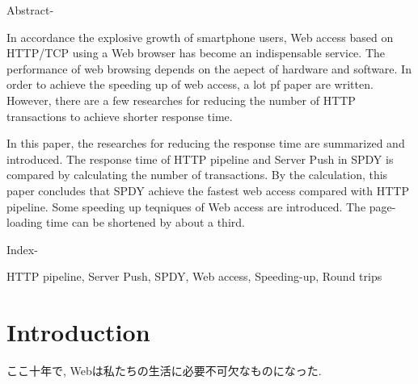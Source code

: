 \documentclass[11pt, a4paper, twocolumn]{jsarticle}
\begin{document}

\begin{spacing}{0.7}
\begin{bfseries}
\begin{itshape}
Abstract-
\end{itshape}
In accordance the explosive growth of smartphone users, Web access based on
HTTP/TCP using a Web browser has become an indispensable service.
The performance of web browsing depends on the aepect of hardware and software.
In order to achieve the speeding up of web access, a lot
pf paper are written.
However, there are a few researches for reducing the number of HTTP transactions
to achieve shorter response time.

In this paper, the researches for reducing the response time are summarized and
introduced.
The response time of HTTP pipeline and Server Push in SPDY is compared by
calculating the number of transactions.
By the calculation, this paper concludes that SPDY achieve the fastest web
access compared with HTTP pipeline.
Some speeding up teqniques of Web access are introduced.
The page-loading time can be shortened by about a third.\\

\begin{itshape}
Index-
\end{itshape}
HTTP pipeline, Server Push, SPDY, Web access, Speeding-up, Round trips
\end{bfseries}
\end{spacing}
\section{Introduction}
ここ十年で, Webは私たちの生活に必要不可欠なものになった.
\end{document}
